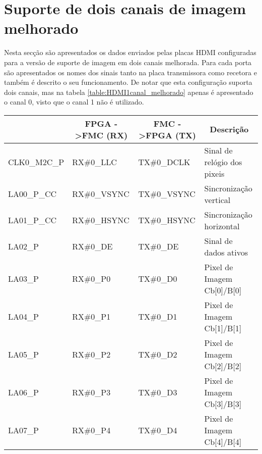 \section{Suporte de dois canais de imagem melhorado} \label{ap1:HDMIconfigMelhorado}

Nesta secção são apresentados os dados enviados pelas placas HDMI configuradas para a versão de suporte de imagem em dois canais melhorada. Para cada porta são apresentados os nomes dos sinais tanto na placa transmissora como recetora e também é descrito o seu funcionamento. De notar que esta configuração suporta dois canais, mas na tabela \ref{table:HDMI1canal_melhorado} apenas é apresentado o canal 0, visto que o canal 1 não é utilizado.

\begin{longtable}[h!]
	{@{}llll@{}}
	\hline
	\centering
	\multicolumn{1}{c}{\textbf{PORTA}} & \multicolumn{1}{c}{\textbf{FPGA -\textgreater FMC (RX)}} & \multicolumn{1}{c}{\textbf{FMC -\textgreater FPGA (TX)}} & \multicolumn{1}{c}{\textbf{Descrição}} \\ \hline \endhead
	CLK0\_M2C\_P & RX\#0\_LLC          				& TX\#0\_DCLK                          & Sinal de relógio dos pixeis 			\\ 
	LA00\_P\_CC  & RX\#0\_VSYNC         			  & TX\#0\_VSYNC                         & Sincronização vertical         		\\ 
	LA01\_P\_CC  & RX\#0\_HSYNC         		  & TX\#0\_HSYNC                         & Sincronização horizontal       		\\ 
	LA02\_P      & RX\#0\_DE            				   & TX\#0\_DE                            & Sinal de dados ativos          		\\
	LA03\_P      & RX\#0\_P0            				   & TX\#0\_D0                            & Pixel de Imagem Cb{[}0{]}/B{[}0{]}   \\
	LA04\_P      & RX\#0\_P1            		      & TX\#0\_D1                            & Pixel de Imagem Cb{[}1{]}/B{[}1{]}   \\ 
	LA05\_P      & RX\#0\_P2            			      & TX\#0\_D2                            & Pixel de Imagem Cb{[}2{]}/B{[}2{]}   \\ 
	LA06\_P      & RX\#0\_P3            			      & TX\#0\_D3                            & Pixel de Imagem Cb{[}3{]}/B{[}3{]}   \\ 
	LA07\_P      & RX\#0\_P4            			      & TX\#0\_D4                            & Pixel de Imagem Cb{[}4{]}/B{[}4{]}   \\ 

\end{longtable}
